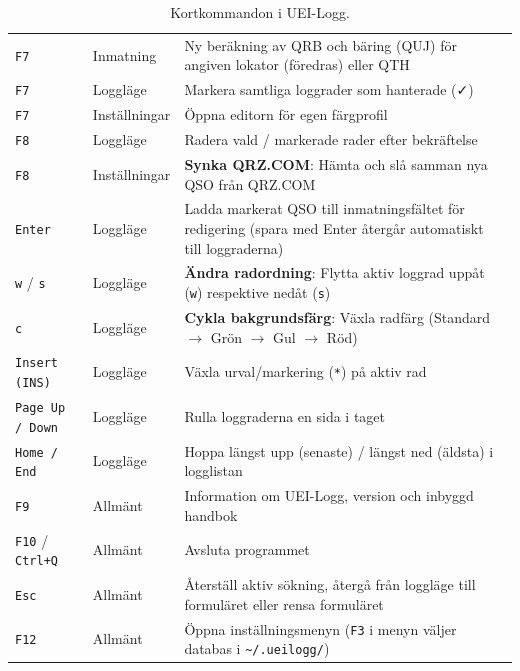 \documentclass[11pt,a4paper]{article}
\begin{document}
\begin{table}[htbp]
\begin{tabularx}{\textwidth}{llX}
\texttt{F7} & Inmatning & Ny beräkning av QRB och bäring (QUJ) för angiven lokator (föredras) eller QTH \\
\texttt{F7} & Loggläge & Markera samtliga loggrader som hanterade (✓) \\
\texttt{F7} & Inställningar & Öppna editorn för egen färgprofil \\
\texttt{F8} & Loggläge & Radera vald / markerade rader efter bekräftelse \\
\texttt{F8} & Inställningar & \textbf{Synka QRZ.COM}: Hämta och slå samman nya QSO från QRZ.COM \\
\texttt{Enter} & Loggläge & Ladda markerat QSO till inmatningsfältet för redigering (spara med Enter återgår automatiskt till loggraderna) \\
\texttt{w} / \texttt{s} & Loggläge & \textbf{Ändra radordning}: Flytta aktiv loggrad uppåt (\texttt{w}) respektive nedåt (\texttt{s}) \\
\texttt{c} & Loggläge & \textbf{Cykla bakgrundsfärg}: Växla radfärg (Standard $\rightarrow$ Grön $\rightarrow$ Gul $\rightarrow$ Röd) \\
\texttt{Insert (INS)} & Loggläge & Växla urval/markering (\texttt{*}) på aktiv rad \\
\texttt{Page Up / Down} & Loggläge & Rulla loggraderna en sida i taget \\
\texttt{Home / End} & Loggläge & Hoppa längst upp (senaste) / längst ned (äldsta) i logglistan \\
\texttt{F9} & Allmänt & Information om UEI-Logg, version och inbyggd handbok \\
\texttt{F10} / \texttt{Ctrl+Q} & Allmänt & Avsluta programmet \\
\texttt{Esc} & Allmänt & Återställ aktiv sökning, återgå från loggläge till formuläret eller rensa formuläret \\
\texttt{F12} & Allmänt & Öppna inställningsmenyn (\texttt{F3} i menyn väljer databas i \texttt{\textasciitilde/.ueilogg/}) \\
\bottomrule
\end{tabularx}
\caption{Kortkommandon i UEI-Logg.}
\end{table}
\end{document}
